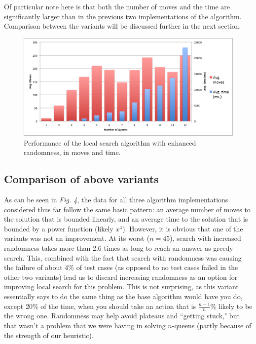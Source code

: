 \documentclass{article}
\begin{document}
\begin{doublespace}
Of particular note here is that both the number of moves and the time are significantly larger than in the previous two implementations of the algorithm. Comparison between the variants will be discussed further in the next section.

\begin{figure}[ht!]
\centering
\includegraphics[width=6.5in]{./random.png}
\caption{Performance of the local search algorithm with enhanced randomness, in moves and time.}
\end{figure}

\subsection{Comparison of above variants}
As can be seen in \textit{Fig. 4}, the data for all three algorithm implementations considered thus far follow the same basic pattern: an average number of moves to the solution that is bounded linearly, and an average time to the solution that is bounded by a power function (likely $x^4$). However, it is obvious that one of the variants was not an improvement. At its worst ($n=45$), search with increased randomness takes more than 2.6 times as long to reach an answer as greedy search. This, combined with the fact that search with randomness was causing the failure of about 4\% of test cases (as opposed to no test cases failed in the other two variants) lead us to discard increasing randomness as an option for improving local search for this problem. This is not surprising, as this variant essentially says to do the same thing as the base algorithm would have you do, except 20\% of the time, when you should take an action that is $\frac{n-1}{n}$\% likely to be the wrong one. Randomness may help avoid plateaus and ``getting stuck," but that wasn't a problem that we were having in solving $n$-queens (partly because of the strength of our heuristic).


\end{doublespace}
\end{document}
